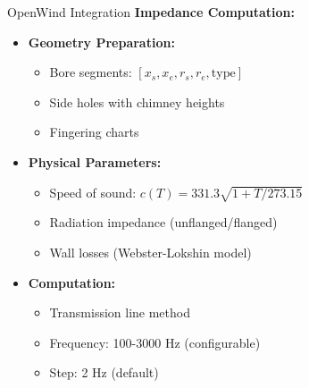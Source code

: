 \documentclass[aspectratio=169,10pt]{beamer}
\begin{document}
\begin{frame}{OpenWind Integration}
\textbf{Impedance Computation:}

\begin{itemize}
    \item \textbf{Geometry Preparation:}
    \begin{itemize}
        \item Bore segments: $[x_s, x_e, r_s, r_e, \text{type}]$
        \item Side holes with chimney heights
        \item Fingering charts
    \end{itemize}
    
    \item \textbf{Physical Parameters:}
    \begin{itemize}
        \item Speed of sound: $c(T) = 331.3\sqrt{1 + T/273.15}$
        \item Radiation impedance (unflanged/flanged)
        \item Wall losses (Webster-Lokshin model)
    \end{itemize}
    
    \item \textbf{Computation:}
    \begin{itemize}
        \item Transmission line method
        \item Frequency: 100-3000 Hz (configurable)
        \item Step: 2 Hz (default)
    \end{itemize}
\end{itemize}
\end{frame}
\end{document}
